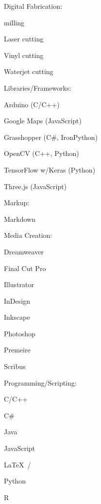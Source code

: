 \documentclass[letterpaper, oneside, 10pt]{article}
\begin{document}
\begin{multicols}{2}
{  {\jostmedium Digital Fabrication:}%
    \begin{itemize*}[%
      label=\relax, labelwidth=0pt, itemjoin=\space\char"00B7%
    ]%
      \item {}%
      \item {} milling%
      \item Laser cutting%
      \item Vinyl cutting%
      \item Waterjet cutting%
    \end{itemize*}


  {\jostmedium Libraries/Frameworks:}%
    \begin{itemize*}[%
      label=\relax, labelwidth=0pt, itemjoin=\space\char"00B7%
    ]%
      \item Arduino  (C/C++)%
      \item Google Maps  (JavaScript)%
      \item Grasshopper  (C\#, IronPython)%
      \item OpenCV (C++, Python)%
      \item TensorFlow w/Keras (Python)%
      \item Three.js (JavaScript)%
    \end{itemize*}


  {\jostmedium Markup:}%
    \begin{itemize*}[%
      label=\relax, labelwidth=0pt, itemjoin=\space\char"00B7%
    ]%
      \item {}%
      \item {}%
      \item Markdown%
    \end{itemize*}


  {\jostmedium Media Creation:}%
    \begin{itemize*}[%
      label=\relax, labelwidth=0pt, itemjoin=\space\char"00B7%
    ]%
      \item Dreamweaver%
      \item Final Cut Pro%
      \item Illustrator%
      \item InDesign%
      \item Inkscape%
      \item Photoshop%
      \item Premeire%
      \item Scribus%
    \end{itemize*}


  {\jostmedium Programming/Scripting:}%
    \begin{itemize*}[%
      label=\relax, labelwidth=0pt, itemjoin=\space\char"00B7%
    ]%
      \item C/C++%
      \item C\#%
      \item Java%
      \item JavaScript%
      \item \LaTeX\ /\ %
      \item Python%
      \item R%
      \item {}
    \end{itemize*}

}
\end{multicols}
\end{document}
